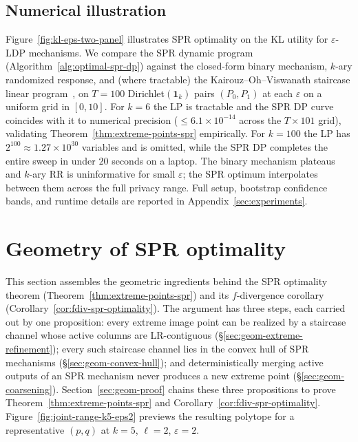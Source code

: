\documentclass{article}
\theoremstyle{plain}
\theoremstyle{definition}
\theoremstyle{plain}
\newcommand{\eps}{\varepsilon}
\begin{document}
\subsection{Numerical illustration}
\label{sec:experiments-main}

Figure~\ref{fig:kl-eps-two-panel} illustrates SPR optimality on the KL utility for $\eps$-LDP mechanisms. We compare the SPR dynamic program (Algorithm~\ref{alg:optimal-spr-dp}) against the closed-form binary mechanism, $k$-ary randomized response, and (where tractable) the Kairouz--Oh--Viswanath staircase linear program~\cite{Kairouz2016ExtremalMechanisms}, on $T=100$ Dirichlet$(\mathbf 1_k)$ pairs $(P_0,P_1)$ at each $\eps$ on a uniform grid in $[0,10]$. For $k=6$ the LP is tractable and the SPR DP curve coincides with it to numerical precision ($\le 6.1\times 10^{-14}$ across the $T\times 101$ grid), validating Theorem~\ref{thm:extreme-points-spr} empirically. For $k=100$ the LP has $2^{100}\approx 1.27\times 10^{30}$ variables and is omitted, while the SPR DP completes the entire sweep in under $20$ seconds on a laptop. The binary mechanism plateaus and $k$-ary RR is uninformative for small $\eps$; the SPR optimum interpolates between them across the full privacy range. Full setup, bootstrap confidence bands, and runtime details are reported in Appendix~\ref{sec:experiments}.

\section{Geometry of SPR optimality}
\label{sec:geometry-of-spr}

This section assembles the geometric ingredients behind the SPR optimality theorem (Theorem~\ref{thm:extreme-points-spr}) and its $f$-divergence corollary (Corollary~\ref{cor:fdiv-spr-optimality}). The argument has three steps, each carried out by one proposition: every extreme image point can be realized by a staircase channel whose active columns are LR-contiguous (\S\ref{sec:geom-extreme-refinement}); every such staircase channel lies in the convex hull of SPR mechanisms (\S\ref{sec:geom-convex-hull}); and deterministically merging active outputs of an SPR mechanism never produces a new extreme point (\S\ref{sec:geom-coarsening}). Section~\ref{sec:geom-proof} chains these three propositions to prove Theorem~\ref{thm:extreme-points-spr} and Corollary~\ref{cor:fdiv-spr-optimality}. Figure~\ref{fig:joint-range-k5-eps2} previews the resulting polytope for a representative $(p,q)$ at $k=5$, $\ell=2$, $\varepsilon=2$.
\end{document}
